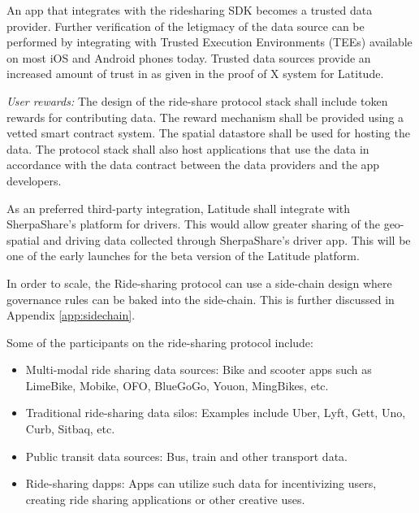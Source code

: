 An app that integrates with the ridesharing SDK becomes a trusted data provider. Further verification of the letigmacy
of the data source can be performed by integrating with Trusted Execution Environments (TEEs) available on most iOS and
Android phones today. Trusted data sources provide an increased amount of trust in as given in the proof of X system for
Latitude.

\noindent
{\em User rewards:} The design of the ride-share protocol stack shall include token rewards for contributing data. The
reward mechanism shall be provided using a vetted smart contract system. The spatial datastore shall be used for hosting
the data. The protocol stack shall also host applications that use the data in accordance with the data contract between the
data providers and the app developers.

As an preferred third-party integration, Latitude shall integrate with SherpaShare's platform for drivers. This would
allow greater sharing of the geo-spatial and driving data collected through SherpaShare's driver app. This will be one
of the early launches for the beta version of the Latitude platform.

In order to scale, the Ride-sharing protocol can use a side-chain design where governance rules can be baked into the
side-chain. This is further discussed in Appendix \ref{app:sidechain}.

Some of the participants on the ride-sharing protocol include:

\begin{itemize}
    \item Multi-modal ride sharing data sources: Bike and scooter apps such as LimeBike, Mobike, OFO, BlueGoGo, Youon,
        MingBikes, etc.
    \item Traditional ride-sharing data silos: Examples include Uber, Lyft, Gett, Uno, Curb, Sitbaq, etc.
    \item Public transit data sources: Bus, train and other transport data.
    \item Ride-sharing dapps: Apps can utilize such data for incentivizing users, creating ride sharing applications or
        other creative uses.
\end{itemize}

%
%
%

